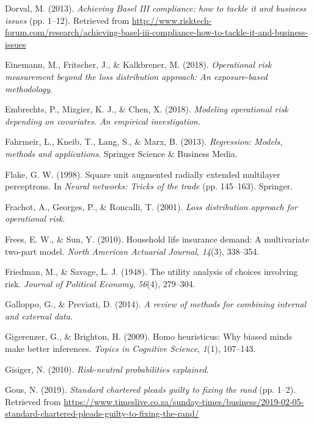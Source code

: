\documentclass{DissertateUSU}
\begin{document}
\leavevmode\hypertarget{ref-mysis2013}{}%
Dorval, M. (2013). \emph{Achieving Basel III compliance: how to tackle
it and business issues} (pp. 1--12). Retrieved from
\url{http://www.risktech-forum.com/research/achieving-basel-iii-compliance-how-to-tackle-it-and-business-issues}

\leavevmode\hypertarget{ref-einemann2018operational}{}%
Einemann, M., Fritscher, J., \& Kalkbrener, M. (2018). \emph{Operational
risk measurement beyond the loss distribution approach: An
exposure-based methodology}.

\leavevmode\hypertarget{ref-embrechts2018modeling}{}%
Embrechts, P., Mizgier, K. J., \& Chen, X. (2018). \emph{Modeling
operational risk depending on covariates. An empirical investigation.}

\leavevmode\hypertarget{ref-fahrmeir2013regression}{}%
Fahrmeir, L., Kneib, T., Lang, S., \& Marx, B. (2013). \emph{Regression:
Models, methods and applications}. Springer Science \& Business Media.

\leavevmode\hypertarget{ref-flake1998square}{}%
Flake, G. W. (1998). Square unit augmented radially extended multilayer
perceptrons. In \emph{Neural networks: Tricks of the trade} (pp.
145--163). Springer.

\leavevmode\hypertarget{ref-frachot2001loss}{}%
Frachot, A., Georges, P., \& Roncalli, T. (2001). \emph{Loss
distribution approach for operational risk}.

\leavevmode\hypertarget{ref-frees2010household}{}%
Frees, E. W., \& Sun, Y. (2010). Household life insurance demand: A
multivariate two-part model. \emph{North American Actuarial Journal},
\emph{14}(3), 338--354.

\leavevmode\hypertarget{ref-friedman1948utility}{}%
Friedman, M., \& Savage, L. J. (1948). The utility analysis of choices
involving risk. \emph{Journal of Political Economy}, \emph{56}(4),
279--304.

\leavevmode\hypertarget{ref-galloppo2014review}{}%
Galloppo, G., \& Previati, D. (2014). \emph{A review of methods for
combining internal and external data}.

\leavevmode\hypertarget{ref-gigerenzer2009homo}{}%
Gigerenzer, G., \& Brighton, H. (2009). Homo heuristicus: Why biased
minds make better inferences. \emph{Topics in Cognitive Science},
\emph{1}(1), 107--143.

\leavevmode\hypertarget{ref-gisiger2010risk}{}%
Gisiger, N. (2010). \emph{Risk-neutral probabilities explained}.

\leavevmode\hypertarget{ref-suntimes2019}{}%
Gous, N. (2019). \emph{Standard chartered pleads guilty to fixing the
rand} (pp. 1--2). Retrieved from
\url{https://www.timeslive.co.za/sunday-times/business/2019-02-05-standard-chartered-pleads-guilty-to-fixing-the-rand/}
\end{document}
